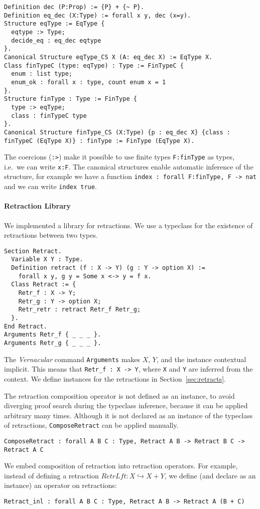 \begin{lstlisting}
Definition dec (P:Prop) := {P} + {~ P}.
Definition eq_dec (X:Type) := forall x y, dec (x=y).
Structure eqType := EqType {
  eqtype :> Type;
  decide_eq : eq_dec eqtype
}.
Canonical Structure eqType_CS X (A: eq_dec X) := EqType X.
Class finTypeC (type: eqType) : Type := FinTypeC {
  enum : list type;
  enum_ok : forall x : type, count enum x = 1
}.
Structure finType : Type := FinType {
  type :> eqType;
  class : finTypeC type
}.
Canonical Structure finType_CS (X:Type) {p : eq_dec X} {class : finTypeC (EqType X)} : finType := FinType (EqType X).
\end{lstlisting}%

The coercions (\lstinline!:>!) make it possible to use finite types \lstinline{F:finType} as types, i.e.\ we can write \lstinline!x:F!.  The canonical
structures enable automatic inference of the structure, for example we have a function \lstinline!index : forall F:finType, F -> nat! and we can write
\lstinline!index true!.

\paragraph{Retraction Library}

We implemented a library for retractions.  We use a typeclass for the existence of retractions between two types.
\begin{lstlisting}
Section Retract.
  Variable X Y : Type.
  Definition retract (f : X -> Y) (g : Y -> option X) :=
    forall x y, g y = Some x <-> y = f x.
  Class Retract := {
    Retr_f : X -> Y;
    Retr_g : Y -> option X;
    Retr_retr : retract Retr_f Retr_g;
  }.
End Retract.
Arguments Retr_f { _ _ _ }.
Arguments Retr_g { _ _ _ }.
\end{lstlisting}
The \textit{Vernacular} command \lstinline!Arguments! makes $X$, $Y$, and the instance contextual implicit.  This means that
\lstinline!Retr_f : X -> Y!, where \lstinline!X! and \lstinline!Y! are inferred from the context.  We define instances for the retractions in
Section~\ref{sec:retracts}.

The retraction composition operator is not defined as an instance, to avoid diverging proof search during the typeclass inference, because it can be
applied arbitrary many times.  Although it is not declared as an instance of the typeclass of retractions, \lstinline!ComposeRetract! can be applied
manually.
\begin{lstlisting}
ComposeRetract : forall A B C : Type, Retract A B -> Retract B C -> Retract A C
\end{lstlisting}
We embed composition of retraction into retraction operators.  For example, instead of defining a retraction $RetrLft : X \hookrightarrow X+Y$, we
define (and declare as an instance) an operator on retractions:
\begin{lstlisting}
Retract_inl : forall A B C : Type, Retract A B -> Retract A (B + C)
\end{lstlisting}



